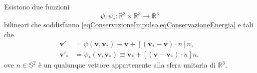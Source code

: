         \begin{prp}\label{prpVelocitàCollisionali}
          Esistono due funzioni \[\psi,\psi_*\colon\mathbb R^3\times\mathbb R^3\to\mathbb R^3\] bilineari che soddisfanno \cref{eqConservazioneImpulso,eqConservazioneEnergia} e tali che
          \begin{equation}
            \label{eqRegoleInterazioneDeterministicheGas}
            \begin{aligned}
              \mathbf v'&=\psi(\mathbf v,\mathbf v_*)\equiv\mathbf v+[(\mathbf v_*-\mathbf v)\cdot n]n,\\
              \mathbf v'_*&=\psi_*(\mathbf v,\mathbf v_*)\equiv\mathbf v_*+[(\mathbf v-\mathbf v_*)\cdot n]n,
            \end{aligned}
          \end{equation}
          ove \(n\in\mathbb S^2\) è un qualunque vettore appartenente alla sfera unitaria di \(\mathbb R^3\).
        \end{prp}
